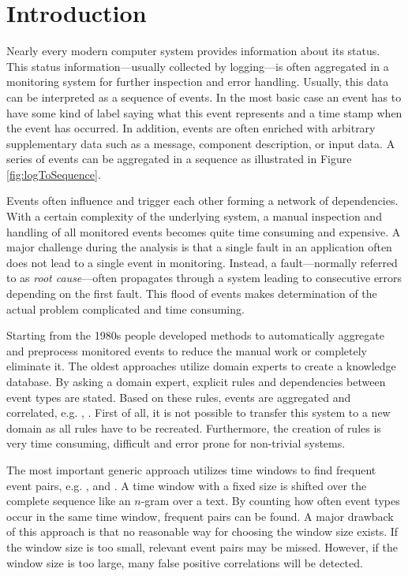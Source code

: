 \documentclass[conference]{IEEEtran}
\theoremstyle{examplestyle}
\begin{document}
\section{Introduction}
Nearly every modern computer system provides information about its status. This status information---usually collected by logging---is often aggregated in a monitoring system for further inspection and error handling. Usually, this data can be interpreted as a sequence of events. In the most basic case an event has to have some kind of label saying what this event represents and a time stamp when the event has occurred. In addition, events are often enriched with arbitrary supplementary data such as a message, component description, or input data. A series of events can be aggregated in a sequence as illustrated in Figure \ref{fig:logToSequence}.

Events often influence and trigger each other forming a network of dependencies. With a certain complexity of the underlying system, a manual inspection and handling of all monitored events becomes quite time consuming and expensive. A major challenge during the analysis is that a single fault in an application often does not lead to a single event in monitoring. Instead, a fault---normally referred to as \textit{root cause}---often propagates through a system leading to consecutive errors depending on the first fault. This flood of events makes determination of the actual problem complicated and time consuming.

Starting from the 1980s people developed methods to automatically aggregate and preprocess monitored events to reduce the manual work or completely eliminate it. The oldest approaches utilize domain experts to create a knowledge database. By asking a domain expert, explicit rules and dependencies between event types are stated. Based on these rules, events are aggregated and correlated, e.g. \cite{Houck1995}, \cite{Kettschau2002}. First of all, it is not possible to transfer this system to a new domain as all rules have to be recreated. Furthermore, the creation of rules is very time consuming, difficult and error prone for non-trivial systems.

The most important generic approach utilizes time windows to find frequent event pairs, e.g. \cite{Jakobson1993}, \cite{Mannila1997} and \cite{Bouandas2007}. A time window with a fixed size is shifted over the complete sequence like an \(n\)-gram over a text. By counting how often event types occur in the same time window, frequent pairs can be found. A major drawback of this approach is that no reasonable way for choosing the window size exists. If the window size is too small, relevant event pairs may be missed. However, if the window size is too large, many false positive correlations will be detected.
\end{document}
